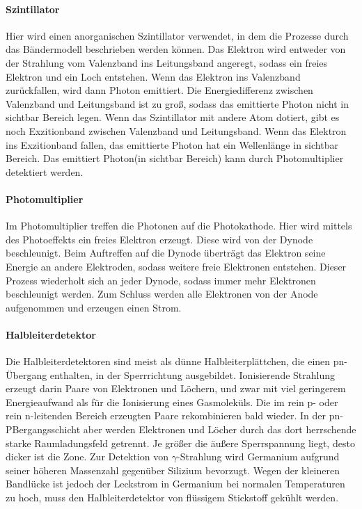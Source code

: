 \documentclass[ngerman,11pt]{article}
\begin{document}
\begin{multicols}{2}
		\paragraph{Szintillator}
		Hier wird einen anorganischen Szintillator verwendet, in dem die Prozesse durch das Bändermodell beschrieben werden können. Das Elektron wird entweder von der Strahlung vom Valenzband ins Leitungsband angeregt, sodass ein freies Elektron und ein Loch entstehen. Wenn das Elektron ins Valenzband zur\"uckfallen, wird dann Photon emittiert. Die Energiedifferenz zwischen Valenzband und Leitungsband ist zu gro\ss, sodass das emittierte Photon nicht in sichtbar Bereich legen. Wenn das Szintillator mit andere Atom dotiert, gibt es noch Exzitionband zwischen Valenzband und Leitungsband. Wenn das Elektron ins Exzitionband fallen, das emittierte Photon hat ein Wellenl\"ange in sichtbar Bereich. Das emittiert Photon(in sichtbar Bereich) kann durch Photomultiplier detektiert werden.
		\paragraph{Photomultiplier}
		Im Photomultiplier treffen die Photonen auf die Photokathode. Hier wird mittels des Photoeffekts ein freies Elektron erzeugt. Diese wird von der Dynode beschleunigt. Beim Auftreffen auf die Dynode überträgt das Elektron seine Energie an andere Elektroden, sodass weitere freie Elektronen entstehen. Dieser Prozess wiederholt sich an jeder Dynode, sodass immer mehr Elektronen beschleunigt werden. Zum Schluss werden alle Elektronen von der Anode aufgenommen und erzeugen einen Strom. 
		\paragraph{Halbleiterdetektor}
		Die Halbleiterdetektoren sind meist als dünne Halbleiterplättchen, die einen pn-Übergang enthalten, in der Sperrrichtung ausgebildet. Ionisierende Strahlung erzeugt darin Paare von Elektronen und Löchern, und zwar mit viel geringerem Energieaufwand als für die Ionisierung eines Gasmoleküls. Die im rein p- oder rein n-leitenden Bereich erzeugten Paare rekombinieren bald wieder. In der pn-PBergangsschicht aber werden Elektronen und Löcher durch das dort herrschende starke Raumladungsfeld getrennt. Je größer die äußere Sperrspannung liegt, desto dicker ist die Zone. \cite{gerthsen}
		Zur Detektion von $\gamma$-Strahlung wird Germanium aufgrund seiner höheren Massenzahl gegenüber Silizium bevorzugt. Wegen der kleineren Bandlücke ist jedoch der Leckstrom in Germanium bei normalen Temperaturen zu hoch, muss den Halbleiterdetektor von flüssigem Stickstoff gekühlt werden. 

\end{multicols}
\end{document}
